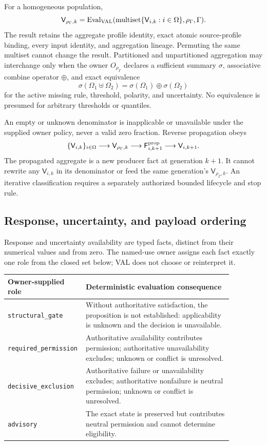 For a homogeneous population,
\[
 \mathsf V_{\rho_\Gamma,k}=\operatorname{Eval}_{\rm VAL}
   (\operatorname{multiset}\{\mathsf V_{i,k}:i\in\Omega\},
    \rho_\Gamma,\Gamma).
\]
The result retains the aggregate profile identity, exact atomic source-profile
binding, every input identity, and aggregation lineage. Permuting the same
multiset cannot change the result. Partitioned and unpartitioned aggregation
may interchange only when the owner $O_{\rho_\Gamma}$ declares a sufficient
summary $\sigma$, associative combine operator $\oplus$, and exact equivalence
\[
 \sigma(\Omega_1\uplus\Omega_2)
 =\sigma(\Omega_1)\oplus\sigma(\Omega_2)
\]
for the active missing rule, threshold, polarity, and uncertainty. No
equivalence is presumed for arbitrary thresholds or quantiles.

An empty or unknown denominator is inapplicable or unavailable under the
supplied owner policy, never a valid zero fraction. Reverse propagation obeys
\[
 \{\mathsf V_{i,k}\}_{i\in\Omega}
 \longrightarrow\mathsf V_{\rho_\Gamma,k}
 \longrightarrow\mathsf F^{\rm prop}_{i,k+1}
 \longrightarrow\mathsf V_{i,k+1}.
\]
The propagated aggregate is a new producer fact at generation $k+1$. It
cannot rewrite any $\mathsf V_{i,k}$ in its denominator or feed the same
generation's $\mathsf V_{\rho_\Gamma,k}$. An iterative classification requires a
separately authorized bounded lifecycle and stop rule.

\subsection{Response, uncertainty, and payload ordering}

Response and uncertainty availability are typed facts, distinct from their
numerical values and from zero. The named-use owner assigns each fact exactly
one role from the closed set below; VAL does not choose or reinterpret it.

\begin{center}
\begin{tabular}{p{0.23\linewidth}p{0.64\linewidth}}
\toprule
Owner-supplied role & Deterministic evaluation consequence \\
\midrule
\texttt{structural\_gate} & Without authoritative satisfaction, the
proposition is not established: applicability is unknown and the decision is
unavailable. \\
\texttt{required\_permission} & Authoritative availability contributes
permission; authoritative unavailability excludes; unknown or conflict is
unresolved. \\
\texttt{decisive\_exclusion} & Authoritative failure or unavailability
excludes; authoritative nonfailure is neutral permission; unknown or conflict
is unresolved. \\
\texttt{advisory} & The exact state is preserved but contributes neutral
permission and cannot determine eligibility. \\
\bottomrule
\end{tabular}
\end{center}


